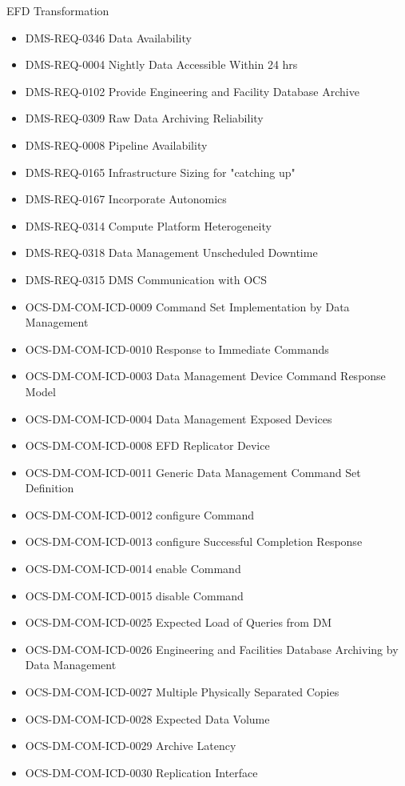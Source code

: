 EFD Transformation \begin{itemize}
\item DMS-REQ-0346 Data Availability
\item DMS-REQ-0004 Nightly Data Accessible Within 24 hrs
\item DMS-REQ-0102 Provide Engineering and Facility Database Archive
\item DMS-REQ-0309 Raw Data Archiving Reliability
\item DMS-REQ-0008 Pipeline Availability
\item DMS-REQ-0165 Infrastructure Sizing for "catching up"
\item DMS-REQ-0167 Incorporate Autonomics
\item DMS-REQ-0314 Compute Platform Heterogeneity
\item DMS-REQ-0318 Data Management Unscheduled Downtime
\item DMS-REQ-0315 DMS Communication with OCS
\item OCS-DM-COM-ICD-0009 Command Set Implementation by Data Management
\item OCS-DM-COM-ICD-0010 Response to Immediate Commands
\item OCS-DM-COM-ICD-0003 Data Management Device Command Response Model
\item OCS-DM-COM-ICD-0004 Data Management Exposed Devices
\item OCS-DM-COM-ICD-0008 EFD Replicator Device
\item OCS-DM-COM-ICD-0011 Generic Data Management Command Set Definition
\item OCS-DM-COM-ICD-0012 configure Command
\item OCS-DM-COM-ICD-0013 configure Successful Completion Response
\item OCS-DM-COM-ICD-0014 enable Command
\item OCS-DM-COM-ICD-0015 disable Command
\item OCS-DM-COM-ICD-0025 Expected Load of Queries from DM
\item OCS-DM-COM-ICD-0026 Engineering and Facilities Database Archiving by Data Management
\item OCS-DM-COM-ICD-0027 Multiple Physically Separated Copies
\item OCS-DM-COM-ICD-0028 Expected Data Volume
\item OCS-DM-COM-ICD-0029 Archive Latency
\item OCS-DM-COM-ICD-0030 Replication Interface
\end{itemize}
